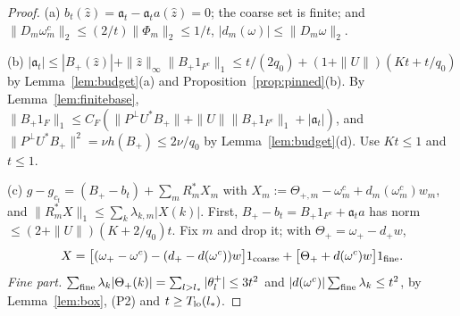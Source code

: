 \documentclass[10pt]{amsart}
\theoremstyle{definition}
\theoremstyle{remark}
\newcommand{\zh}{\hat z}
\begin{document}
\begin{proof}
(a) $b_t(\zh)=\mathfrak a_t-\mathfrak a_ta(\zh)=0$; the coarse set is finite; and
$\|D_m\omega^c_m\|_2\le(2/t)\|\Phi_m\|_2\le1/t$, $|d_m(\omega)|\le
\|D_m\omega\|_2$.

(b) $|\mathfrak a_t|\le|B_+(\zh)|+\|\zh\|_\infty\|B_+1_{F^c}\|_1\le t/(2q_0)+
(1+\|U\|)(Kt+t/q_0)$ by Lemma~\ref{lem:budget}(a) and
Proposition~\ref{prop:pinned}(b).  By Lemma~\ref{lem:finitebase},
$\|B_+1_F\|_1\le C_F(\|P^\perp U^*B_+\|+\|U\|\|B_+1_{F^c}\|_1+|\mathfrak a_t|)$,
and $\|P^\perp U^*B_+\|^2=\nu h(B_+)\le2\nu/q_0$ by
Lemma~\ref{lem:budget}(d).  Use $Kt\le1$ and $t\le1$.

(c) $g-g_{c_t}=(B_+-b_t)+\sum_mR_m^*X_m$ with $X_m:=\Theta_{+,m}-\omega^c_m+
d_m(\omega^c_m)w_m$, and $\|R^*_mX\|_1\le\sum_k\lambda_{k,m}|X(k)|$.  First,
$B_+-b_t=B_+1_{F^c}+\mathfrak a_ta$ has norm $\le(2+\|U\|)(K+2/q_0)t$.  Fix $m$
and drop it; with $\Theta_+=\omega_+-d_+w$,
\[
 X=\big[(\omega_+-\omega^c)-(d_+-d(\omega^c))w\big]1_{\rm coarse}+
 \big[\Theta_++d(\omega^c)w\big]1_{\rm fine}.
\]
\emph{Fine part.}  $\sum_{\rm fine}\lambda_k|\Theta_+(k)|=\sum_{l>l_*}
|\theta^+_l|\le3t^2$ and $|d(\omega^c)|\sum_{\rm fine}\lambda_k\le t^2$, by
Lemma~\ref{lem:box}, (P2) and $t\ge T_{\rm lo}(l_*)$.


\end{proof}
\end{document}
